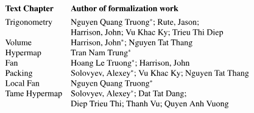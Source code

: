 \def\x#1{\text{#1}}

\[
\begin{array}{lll}
\x{\bf Text~Chapter} & \x{\bf Author~of~formalization~work}
\vspace{4pt}\\
\x{Trigonometry} & \x{Nguyen Quang Truong\ast; Rute, Jason;}
\\&\x{Harrison, John; Vu Khac Ky; Trieu Thi Diep}\\
\x{Volume} & \x{Harrison, John\ast; Nguyen Tat Thang}\\
\x{Hypermap} &  \x{Tran Nam Trung}\ast\\
\x{Fan} & \x{Hoang Le Truong\ast; Harrison, John}\\
\x{Packing} & \x{Solovyev, Alexey\ast; Vu Khac Ky; Nguyen Tat Thang}\\
\x{Local Fan} & \x{Nguyen Quang Truong\ast}\\
\x{Tame Hypermap} & \x{Solovyev, Alexey\ast; Dat Tat Dang;}\\
&\x{Diep Trieu Thi; Thanh Vu; Quyen Anh Vuong}
\end{array}
\]


\newpage